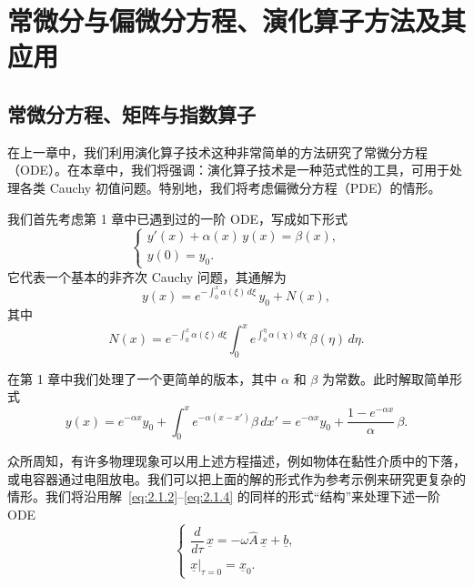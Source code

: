 
\chapter{常微分与偏微分方程、演化算子方法及其应用}

\section{常微分方程、矩阵与指数算子}

在上一章中，我们利用演化算子技术这种非常简单的方法研究了常微分方程（ODE）。在本章中，我们将强调：演化算子技术是一种范式性的工具，可用于处理各类 Cauchy 初值问题。特别地，我们将考虑偏微分方程（PDE）的情形。

我们首先考虑第 1 章中已遇到过的一阶 ODE，写成如下形式
\begin{equation}
\begin{cases}
y'(x)+\alpha(x)\,y(x)=\beta(x),\\[2mm]
y(0)=y_{0}.
\end{cases}
\label{eq:2.1.1}
\end{equation}
它代表一个基本的非齐次 Cauchy 问题，其通解为
\begin{equation}
y(x)=e^{-\int_{0}^{x}\alpha(\xi)\,d\xi}\,y_{0}+N(x),
\label{eq:2.1.2}
\end{equation}
其中
\begin{equation}
N(x)=e^{-\int_{0}^{x}\alpha(\xi)\,d\xi}
\int_{0}^{x} e^{\int_{0}^{\eta}\alpha(\chi)\,d\chi}\,\beta(\eta)\,d\eta.
\label{eq:2.1.3}
\end{equation}

在第 1 章中我们处理了一个更简单的版本，其中 $\alpha$ 和 $\beta$ 为常数。此时解取简单形式
\begin{equation}
y(x)=e^{-\alpha x}y_{0}+\int_{0}^{x}e^{-\alpha(x-x')}\beta\,dx'
=e^{-\alpha x}y_{0}+\frac{1-e^{-\alpha x}}{\alpha}\,\beta.
\label{eq:2.1.4}
\end{equation}

众所周知，有许多物理现象可以用上述方程描述，例如物体在黏性介质中的下落，或电容器通过电阻放电。我们可以把上面的解的形式作为参考示例来研究更复杂的情形。我们将沿用解~\eqref{eq:2.1.2}--\eqref{eq:2.1.4} 的同样的形式``结构''来处理下述一阶 ODE
\begin{equation}
\begin{cases}
\dfrac{d}{d\tau}\,\underline{x}=-\omega\hat{A}\,\underline{x}+\underline{b},\\[2mm]
\underline{x}\big|_{\tau=0}=\underline{x}_{0}.
\end{cases}
\label{eq:2.1.5}
\end{equation}

